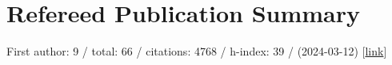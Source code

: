 \section*{Refereed Publication Summary}

First author: 9 / total: 66 / citations: 4768 / h-index: 39 / (2024-03-12) [\href{https://ui.adsabs.harvard.edu/#/public-libraries/G0Ow9TGTRyuVT7hbhzailA}{link}]
